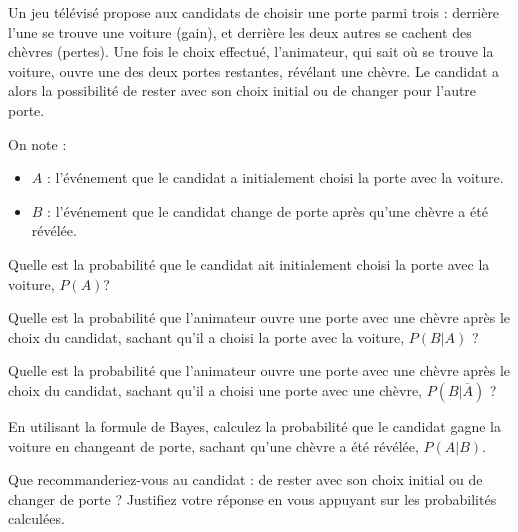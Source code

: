 \documentclass[11pt]{article}
\begin{document}
\begin{exercice}
Un jeu télévisé propose aux candidats de choisir une porte parmi trois : derrière l'une se trouve une voiture (gain), et derrière les deux autres se cachent des chèvres (pertes). Une fois le choix effectué, l'animateur, qui sait où se trouve la voiture, ouvre une des deux portes restantes, révélant une chèvre. Le candidat a alors la possibilité de rester avec son choix initial ou de changer pour l'autre porte.

On note :
\begin{itemize}
\item \( A \) : l'événement que le candidat a initialement choisi la
  porte avec la voiture.
\item   \( B \) : l'événement que le candidat change
  de porte après qu'une chèvre a été révélée.
\end{itemize}

\begin{enu}
\item Quelle est la probabilité que le candidat ait initialement choisi la porte avec la voiture, \( P(A) \)?
\item Quelle est la probabilité que l'animateur ouvre une porte avec une chèvre après le choix du candidat, sachant qu'il a choisi la porte avec la voiture, \( P(B|A) \) ?
\item Quelle est la probabilité que l'animateur ouvre une porte avec une chèvre après le choix du candidat, sachant qu'il a choisi une porte avec une chèvre, \( P(B|\overline{A}) \) ?
\item En utilisant la formule de Bayes, calculez la probabilité que le candidat gagne la voiture en changeant de porte, sachant qu'une chèvre a été révélée, \( P(A|B) \).
\item Que recommanderiez-vous au candidat : de rester avec son choix initial ou de changer de porte ? Justifiez votre réponse en vous appuyant sur les probabilités calculées.
\end{enu}
\end{exercice}
\end{document}
